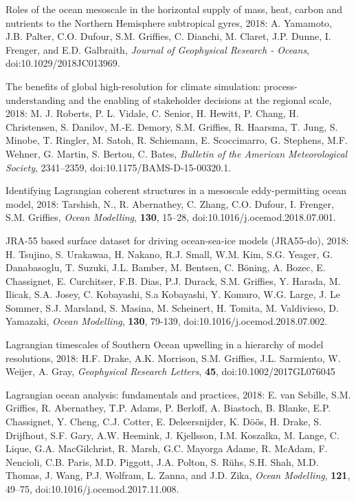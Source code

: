 \begin{etaremune}
\item Roles of the ocean mesoscale in the horizontal supply of mass, heat, carbon and nutrients to the Northern Hemisphere subtropical gyres, 2018: A. Yamamoto, J.B. Palter, C.O. Dufour, S.M. Grif\/f\/ies, C. Dianchi, M. Claret, J.P. Dunne, I. Frenger, and E.D. Galbraith, {\it Journal of Geophysical Research - Oceans},  doi:10.1029/2018JC013969.

\item The benefits of global high-resolution for climate simulation: process-understanding and the enabling of stakeholder decisions at the regional scale, 2018: M. J. Roberts, P. L. Vidale, C. Senior, H. Hewitt, P. Chang, H. Christensen, S. Danilov, M.-E. Demory, S.M. Grif\/f\/ies, R. Haarsma, T. Jung, S. Minobe, T. Ringler, M. Satoh, R. Schiemann, E. Scoccimarro, G. Stephens, M.F. Wehner, G. Martin, S. Bertou, C. Bates, {\it Bulletin of the American Meteorological Society}, 2341--2359, doi:10.1175/BAMS-D-15-00320.1. 

\item Identifying Lagrangian coherent structures in a mesoscale eddy-permitting ocean model, 2018: Tarshish, N., R. Abernathey, C. Zhang, C.O. Dufour, I. Frenger, S.M. Grif\/f\/ies, \textit{Ocean Modelling}, {\bf 130}, 15--28, doi:10.1016/j.ocemod.2018.07.001.

\item JRA-55 based surface dataset for driving ocean-sea-ice models (JRA55-do), 2018: H. Tsujino, S. Urakawaa, H. Nakano, R.J. Small, W.M. Kim, S.G. Yeager, G. Danabasoglu, T. Suzuki, J.L. Bamber, M. Bentsen, C. {B\"{o}ning}, A. Bozec, E. Chassignet, E. Curchitser, F.B. Dias, P.J. Durack, S.M. Grif\/f\/ies, Y. Harada, M. Ilicak, S.A. Josey, C. Kobayashi, S.a Kobayashi, Y. Komuro, W.G. Large, J. {Le Sommer}, S.J. Marsland, S. Masina, M. Scheinert, H. Tomita, M. Valdivieso, D. Yamazaki, {\it Ocean Modelling},  {\bf 130}, 79-139, doi:10.1016/j.ocemod.2018.07.002.

\item Lagrangian timescales of Southern Ocean upwelling in a hierarchy of model resolutions, 2018: H.F. Drake, A.K. Morrison, S.M. Grif\/f\/ies, J.L. Sarmiento, W. Weijer, A. Gray, {\it  Geophysical Research Letters}, {\bf 45}, doi:10.1002/2017GL076045

\item  Lagrangian ocean analysis: fundamentals and practices, 2018: E. van Sebille, S.M. Grif\/f\/ies, R. Abernathey, T.P. Adams, P. Berloff, A. Biastoch, B. Blanke, E.P. Chassignet, Y. Cheng, C.J. Cotter, E. Deleersnijder, K. {D\"{o}\"{o}̈s}, H. Drake, S. Drijfhout, S.F. Gary, A.W. Heemink, J. Kjellsson, I.M. Koszalka, M. Lange, C. Lique, G.A.  MacGilchrist, R. Marsh, G.C. Mayorga Adame, R. McAdam, F. Nencioli, C.B. Paris, M.D. Piggott, J.A. Polton, S. {R\"{u}hs}, S.H. Shah, M.D. Thomas, J. Wang, P.J. Wolfram, L. Zanna, and J.D. Zika, {\it Ocean Modelling},
{\bf 121}, 49--75,  doi:10.1016/j.ocemod.2017.11.008.


\end{etaremune}

